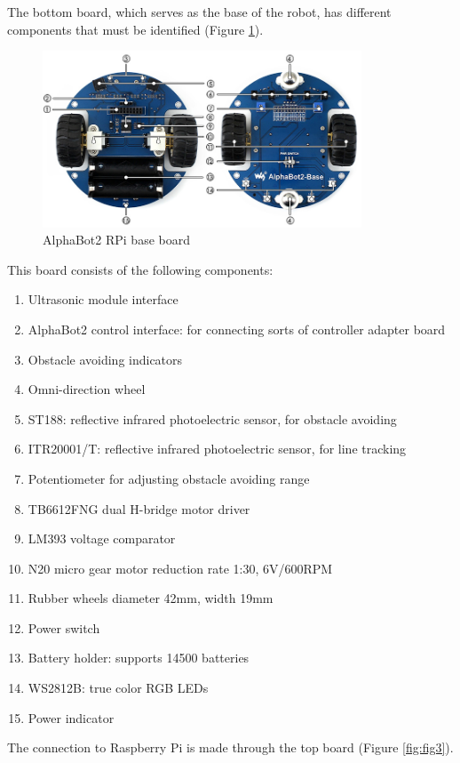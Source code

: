\documentclass[conference]{IEEEtran}
\begin{document}
The bottom board, which serves as the base of the robot, has different components that must be identified (Figure \ref{fig:fig2}).

\begin{figure}[H]
    \centering
    \includegraphics[width=9.50cm]{AlphaBot2-Base-intro.jpg}
    \caption{AlphaBot2 RPi base board}
    \label{fig:fig2}
\end{figure}

This board consists of the following components:

\begin{enumerate}
    \item Ultrasonic module interface
    \item AlphaBot2 control interface: for connecting sorts of controller adapter board
    \item Obstacle avoiding indicators
    \item Omni-direction wheel
    \item ST188: reflective infrared photoelectric sensor, for obstacle avoiding
    \item ITR20001/T: reflective infrared photoelectric sensor, for line tracking
    \item Potentiometer for adjusting obstacle avoiding range
    \item TB6612FNG dual H-bridge motor driver
    \item LM393 voltage comparator
    \item N20 micro gear motor reduction rate 1:30, 6V/600RPM
    \item Rubber wheels diameter 42mm, width 19mm
    \item Power switch
    \item Battery holder: supports 14500 batteries
    \item WS2812B: true color RGB LEDs
    \item Power indicator
\end{enumerate}

The connection to Raspberry Pi is made through the top board (Figure \ref{fig:fig3}).
\end{document}
